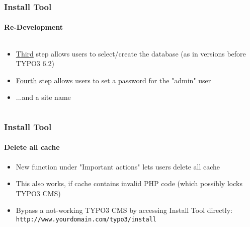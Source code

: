 \begin{frame}[fragile]
	\frametitle{Install Tool}
	\framesubtitle{Re-Development}

	\begin{columns}[T]

		\begin{column}{.5\textwidth}
			\begin{itemize}
				\item \underline{Third} step allows users to select/create the database\newline
					(as in versions before TYPO3 6.2)
				\item \underline{Fourth} step allows users to set a password for the "admin" user
				\item ...and a site name
			\end{itemize}
		\end{column}

		\begin{column}{.5\textwidth}
		\end{column}

	\end{columns}

\end{frame}


\begin{frame}[fragile]
	\frametitle{Install Tool}
	\framesubtitle{Delete all cache}

	\begin{itemize}
		\item New function under "Important actions" lets users delete all cache
		\item This also works, if cache contains invalid PHP code\newline
			(which possibly locks TYPO3 CMS)
		\item Bypass a not-working TYPO3 CMS by accessing Install Tool directly:\newline
			\texttt{http://www.yourdomain.com/typo3/install}

	\end{itemize}


\end{frame}

